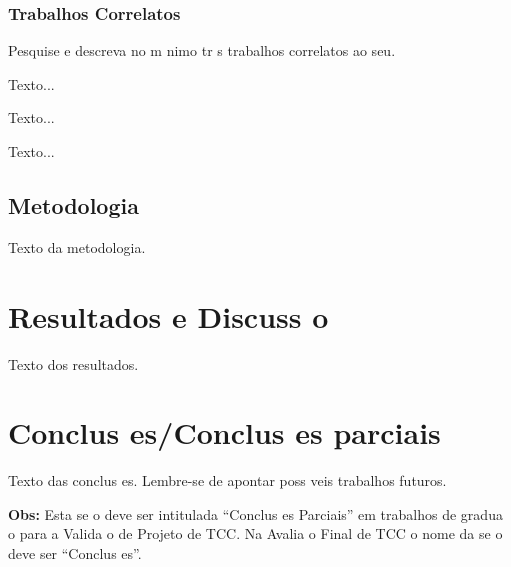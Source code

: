 \documentclass{article}
\begin{document}
     
     \subsubsection{Trabalhos Correlatos}
     
     Pesquise e descreva no m nimo tr s trabalhos correlatos ao seu.
     
     
     Texto...
     
     
     Texto...
     
     
     Texto...
     
     
     \subsection{Metodologia}
     
     Texto da metodologia.
     
     
     
     
     

	\section{Resultados e Discuss o}
    	
     Texto dos resultados.
     
     
     

	\section{Conclus es/Conclus es parciais}
	
	Texto das conclus es. Lembre-se de apontar poss veis trabalhos futuros.
	
	\textbf{Obs:} Esta se o deve ser intitulada ``Conclus es Parciais'' em trabalhos de gradua o para a Valida o de Projeto de TCC. Na Avalia o Final de TCC o nome da se o deve ser ``Conclus es''.
    
    
    
\end{document}
